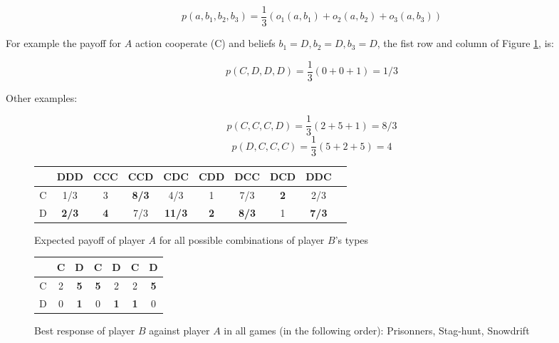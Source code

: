 \documentclass[letterpaper]{article}
\begin{document}
\begin{equation}
 p(a, b_1, b_2, b_3) = \frac{1}{3}(o_1(a, b_1)+o_2(a, b_2)+o_3(a, b_3))
\end{equation}

For example the payoff for $A$ action cooperate (C) and beliefs
$b_1 = D, b_2 = D, b_3 = D$, the fist row and column of Figure \ref{fig:brA},
is:

\begin{equation}
    p(C, D, D, D) = \frac{1}{3}(0 + 0 + 1) = 1/3
\end{equation}

Other examples:

\begin{equation}
    p(C, C, C, D) = \frac{1}{3}(2 + 5 + 1) = 8/3
\end{equation}
\begin{equation}
    p(D, C, C, C) = \frac{1}{3}(5 + 2 + 5) = 4    
\end{equation}

\begin{figure}[!ht]

\begin{center}
\begin{tabular}{|c|c|c|c|c|c|c|c|c|c|}
    \hline
    & DDD & CCC & CCD & CDC & CDD & DCC & DCD & DDC \\
    \hline
    C & 1/3 & 3 & \textbf{8/3} & 4/3 & 1 & 7/3 & \textbf{\color{red}2} & 2/3 \\
    \hline
    D & \textbf{2/3} & \textbf{4} & 7/3 & \textbf{11/3}
    & \textbf{2} & \textbf{8/3} & 1 & \textbf{\color{red}7/3} \\
    \hline
\end{tabular}
\end{center}

\caption{Expected payoff of player $A$ for all possible combinations of
player $B$’s types}
\label{fig:brA}
\end{figure}

\begin{figure}[!ht]

\begin{center}
\begin{tabular}{|c|c|c||c|c||c|c|}
    \hline
    & C & D & C & D & C & D \\
    \hline
    C & 2 & \textbf{5} & \textbf{5}
    & 2 & 2 & \textbf{5} \\
    \hline
    D & 0 & \textbf{1} & 0 & \textbf{1}
    & \textbf{1} & 0 \\
    \hline
\end{tabular}
\end{center}

\caption{Best response of player $B$ against player $A$ in all games
 (in the following order): Prisonners, Stag-hunt, Snowdrift}
\label{fig:brB}
\end{figure}
\end{document}
